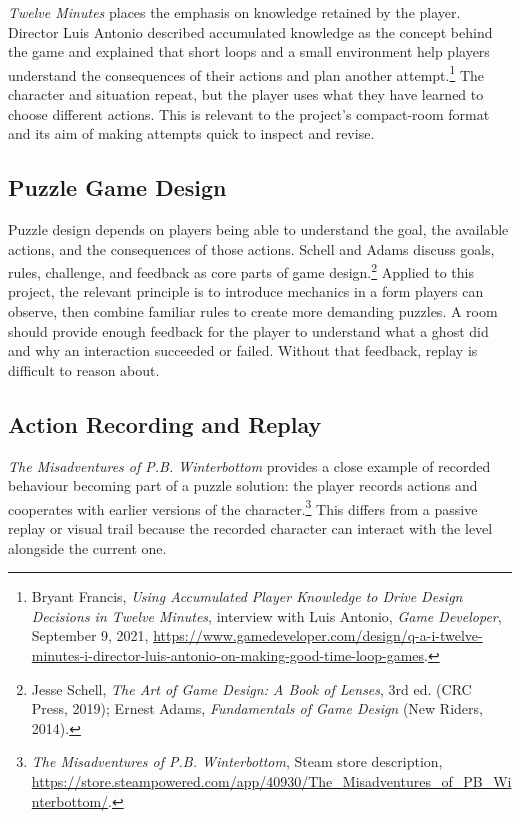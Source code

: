 \textit{Twelve Minutes} places the emphasis on knowledge retained by the player. Director Luis Antonio described accumulated knowledge as the concept behind the game and explained that short loops and a small environment help players understand the consequences of their actions and plan another attempt.\footnote{Bryant Francis, \textit{Using Accumulated Player Knowledge to Drive Design Decisions in Twelve Minutes}, interview with Luis Antonio, \textit{Game Developer}, September 9, 2021, \url{https://www.gamedeveloper.com/design/q-a-i-twelve-minutes-i-director-luis-antonio-on-making-good-time-loop-games}.} The character and situation repeat, but the player uses what they have learned to choose different actions. This is relevant to the project's compact-room format and its aim of making attempts quick to inspect and revise.

\subsection{Puzzle Game Design}

Puzzle design depends on players being able to understand the goal, the available actions, and the consequences of those actions. Schell and Adams discuss goals, rules, challenge, and feedback as core parts of game design.\footnote{Jesse Schell, \textit{The Art of Game Design: A Book of Lenses}, 3rd ed. (CRC Press, 2019); Ernest Adams, \textit{Fundamentals of Game Design} (New Riders, 2014).} Applied to this project, the relevant principle is to introduce mechanics in a form players can observe, then combine familiar rules to create more demanding puzzles. A room should provide enough feedback for the player to understand what a ghost did and why an interaction succeeded or failed. Without that feedback, replay is difficult to reason about.

\subsection{Action Recording and Replay}

\textit{The Misadventures of P.B. Winterbottom} provides a close example of recorded behaviour becoming part of a puzzle solution: the player records actions and cooperates with earlier versions of the character.\footnote{\textit{The Misadventures of P.B. Winterbottom}, Steam store description, \url{https://store.steampowered.com/app/40930/The_Misadventures_of_PB_Winterbottom/}.} This differs from a passive replay or visual trail because the recorded character can interact with the level alongside the current one.

